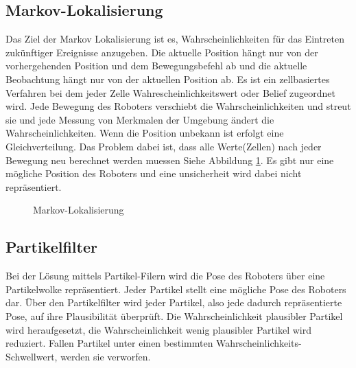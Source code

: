 \documentclass{article}
\begin{document}
\subsection{Markov-Lokalisierung}
Das Ziel der Markov Lokalisierung ist es, Wahrscheinlichkeiten f\"ur das Eintreten zuk\"unftiger Ereignisse anzugeben.
Die aktuelle Position h\"angt nur von der vorhergehenden Position und dem
Bewegungsbefehl ab und die aktuelle Beobachtung h\"angt nur von der aktuellen Position ab.
Es ist ein zellbasiertes Verfahren bei dem jeder Zelle Wahrescheinlichkeitswert oder Belief
zugeordnet wird. \cite{ZweigleStuttgart}
Jede Bewegung des Roboters verschiebt die Wahrscheinlichkeiten und streut sie und jede Messung von Merkmalen der Umgebung \"andert die Wahrscheinlichkeiten.
Wenn die Position unbekann ist erfolgt eine Gleichverteilung.
Das Problem dabei ist, dass alle Werte(Zellen) nach jeder Bewegung neu berechnet werden muessen Siehe Abbildung \ref{MarkovLokalisierung}. Es gibt nur eine m\"ogliche Position des Roboters und eine unsicherheit wird dabei nicht repr\"asentiert.


\begin{figure}
  \centering
  \caption{Markov-Lokalisierung \cite{ZweigleStuttgart}}
  \label{MarkovLokalisierung}
\end{figure}







\subsection{Partikelfilter}
Bei der L\"osung mittels Partikel-Filern wird die Pose des Roboters \"uber eine Partikelwolke repr\"asentiert.\cite{WIKIpartikelfilter} Jeder Partikel stellt eine m\"ogliche Pose des Roboters dar. Über den Partikelfilter wird jeder Partikel, also jede dadurch repr\"asentierte Pose, auf ihre Plausibilit\"at \"uberpr\"uft. Die Wahrscheinlichkeit plausibler Partikel wird heraufgesetzt, die Wahrscheinlichkeit wenig plausibler Partikel wird reduziert. Fallen Partikel unter einen bestimmten Wahrscheinlichkeits-Schwellwert, werden sie verworfen.
\end{document}
